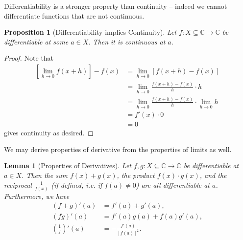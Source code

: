 \documentclass[11pt]{article}
\numberwithin{equation}{section}
\newtheorem{lemma}[theorem]{Lemma}
\newtheorem{proposition}[theorem]{Proposition}
\theoremstyle{definition}
\theoremstyle{remark}
\newcommand{\pqty}[1]{\left(#1\right)}
\newcommand{\bqty}[1]{\left[#1\right]}
\newcommand{\functiondomain}[3]{#1:#2\to #3}
\newcommand{\CC}{\mathbb C}
\begin{document}
Differentiability is a stronger property than continuity -- indeed we cannot differentiate functions that are not continuous.

\begin{proposition}[Differentiability implies Continuity]\label{analysis-unit-0104}
    \label{prop:differentiability-implies-continuity}%
    Let \(\functiondomain{f}{X \subseteq \CC}{\CC}\) be differentiable at some \(a \in X\). Then it is continuous at \(a\).
\end{proposition}

\begin{proof}
    Note that
    \begin{align*}
        \bqty{\lim_{h \to 0} f\pqty{x + h}} - f\pqty{x} &= \lim_{h \to 0} \bqty{f\pqty{x + h} - f\pqty{x}} \\
        &= \lim_{h \to 0} \frac{f\pqty{x + h} - f\pqty{x}}{h} \cdot h \\
        &= \lim_{h \to 0} \frac{f\pqty{x + h} - f\pqty{x}}{h} \cdot \lim_{h \to 0} h \\
        &= f'\pqty{x} \cdot 0 \\
        &= 0
    \end{align*}
    gives continuity as desired.
\end{proof}

We may derive properties of derivative from the properties of limits as well.

\begin{lemma}[Properties of Derivatives]\label{analysis-unit-0105}
    \label{lem:properties-derivatives}%
    Let \(\functiondomain{f, g}{X \subseteq \CC}{\CC}\) be differentiable at \(a \in X\). Then the sum \(f\pqty{x} + g\pqty{x}\), the product \(f\pqty{x} \cdot g\pqty{x}\), and the reciprocal \(\frac{1}{f\pqty{x}}\) (if defined, i.e. if \(f\pqty{a} \neq 0\)) are all differentiable at \(a\). Furthermore, we have
    \begin{align*}
        \pqty{f + g}' \pqty{a} &= f'\pqty{a} + g'\pqty{a}, \\
        \pqty{fg}' \pqty{a} &= f'\pqty{a} g\pqty{a} + f\pqty{a} g'\pqty{a}, \\
        \pqty{\frac{1}{f}}' \pqty{a} &= - \frac{f'\pqty{a}}{\bqty{f\pqty{a}}^2}.
    \end{align*}
\end{lemma}
\end{document}
